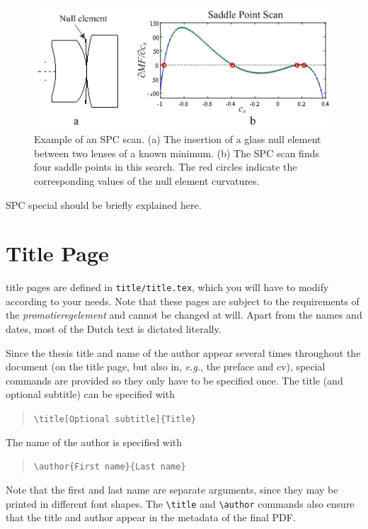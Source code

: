 \begin{figure}[h!]
    \centering
    \includegraphics[scale=0.8]{chapter-2-sp/figures/SPCscan.png}
    \caption{Example of an SPC scan. (a) The insertion of a glass null element between two lenses of a known minimum. (b) The SPC scan finds four saddle points in this search. The red circles indicate the corresponding values of the null element curvatures.}
    \label{fig:SPCscan}
\end{figure}


SPC special should be briefly explained here. 

\section{Title Page}

 title pages are defined in \texttt{title/title.tex}, which you will have to modify according to your needs. Note that these pages are subject to the requirements of the \emph{promotieregelement} and cannot be changed at will. Apart from the names and dates, most of the Dutch text is dictated literally.

Since the thesis title and name of the author appear several times throughout the document (on the title page, but also in, \emph{e.g.}, the preface and cv), special commands are provided so they only have to be specified once. The title (and optional subtitle) can be specified with

\begin{quote}
\texttt{\textbackslash title[Optional subtitle]\{Title\}}
\end{quote}
The name of the author is specified with
\begin{quote}
\texttt{\textbackslash author\{First name\}\{Last name\}}
\end{quote}
Note that the first and last name are separate arguments, since they may be printed in different font shapes. The \texttt{\textbackslash title} and \texttt{\textbackslash author} commands also ensure that the title and author appear in the metadata of the final PDF.

